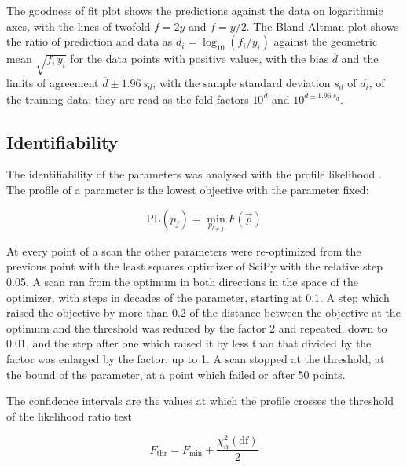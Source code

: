 \documentclass{article}
\begin{document}
The goodness of fit plot shows the predictions against the data on logarithmic axes, with the lines of twofold $f = 2y$ and $f = y/2$. The Bland-Altman plot \cite{Bland1986} shows the ratio of prediction and data as $d_i = \log_{10}(f_i / y_i)$ against the geometric mean $\sqrt{f_i\, y_i}$ for the data points with positive values, with the bias $\overline{d}$ and the limits of agreement $\overline{d} \pm 1.96\, s_d$, with the sample standard deviation $s_d$ of $d_i$, of the training data; they are read as the fold factors $10^{\overline{d}}$ and $10^{\overline{d} \pm 1.96\, s_d}$.

\subsection{Identifiability}

The identifiability of the parameters was analysed with the profile likelihood \cite{Raue2009,Kreutz2013}. The profile of a parameter is the lowest objective with the parameter fixed:

\begin{equation}
\mathrm{PL}(p_j) = \min_{p_{l \neq j}} F(\vec{p})
\end{equation}

At every point of a scan the other parameters were re-optimized from the previous point with the least squares optimizer of SciPy with the relative step 0.05. A scan ran from the optimum in both directions in the space of the optimizer, with steps in decades of the parameter, starting at 0.1. A step which raised the objective by more than 0.2 of the distance between the objective at the optimum and the threshold was reduced by the factor 2 and repeated, down to 0.01, and the step after one which raised it by less than that divided by the factor was enlarged by the factor, up to 1. A scan stopped at the threshold, at the bound of the parameter, at a point which failed or after 50 points.

The confidence intervals are the values at which the profile crosses the threshold of the likelihood ratio test

\begin{equation}
F_{\mathrm{thr}} = F_{\min} + \frac{\chi^2_{\alpha}(\mathrm{df})}{2}
\end{equation}
\end{document}
